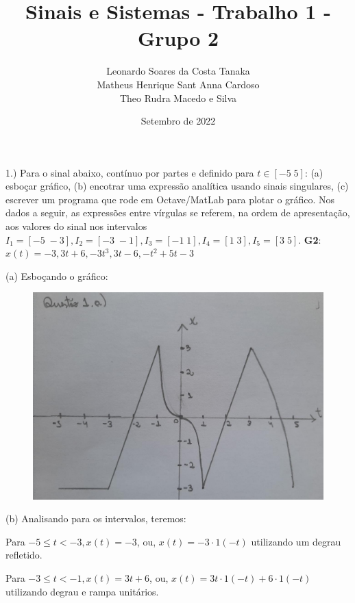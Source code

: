 \documentclass{article}
\title{Sinais e Sistemas - Trabalho 1 - Grupo 2}
\author{
    Leonardo Soares da Costa Tanaka \\
    Matheus Henrique Sant Anna Cardoso \\
    Theo Rudra Macedo e Silva
}
\date{Setembro de 2022}
\begin{document}
\maketitle

1.) Para o sinal abaixo, contínuo por partes e definido para $t \in [-5\;5]$: (a) esboçar gráfico, (b) encotrar uma expressão analítica usando sinais singulares, (c) escrever um programa que rode em Octave/MatLab para plotar o gráfico. Nos dados a seguir, as expressões entre vírgulas se referem, na ordem de apresentação, aos valores do sinal nos intervalos $I_{1} = [-5\;-3], I_{2} = [-3\;-1], I_{3} = [-1\;1], I_{4} = [1\;3], I_{5} = [3\;5]$.
\textbf{G2}: $x(t) = -3, 3t + 6, -3t^3, 3t - 6, -t^2 + 5t - 3$

\vspace{\baselineskip}

(a) Esboçando o gráfico:

\begin{figure}[h]
    \includegraphics[scale=0.23]{plot1a}
    \centering
\end{figure}

\vspace{\baselineskip}

(b) Analisando para os intervalos, teremos:

\vspace{\baselineskip}

Para $ -5 \leq t < -3, x(t) = -3 $, ou, $ x(t) = -3 \cdot 1(-t) $ utilizando um degrau refletido.

\vspace{\baselineskip}

Para $ -3 \leq t < -1, x(t) = 3t + 6 $, ou, $ x(t) = 3t \cdot 1(-t) + 6 \cdot 1(-t) $ utilizando degrau e rampa unitários.
\end{document}

